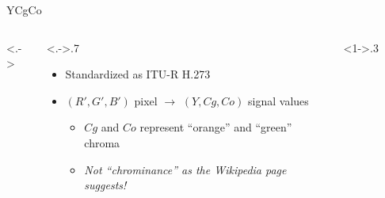 \documentclass[aspectratio=169,usepdftitle=false]{fireshonks}
\begin{document}
\begin{frame}{YCgCo}
    \begin{columns}<.->
        \begin{column}<.->{.7\textwidth}
            \begin{itemize}
                \item Standardized as ITU-R H.273 \parencite*{ycocg}
                \item $(R', G', B')$ pixel $\rightarrow$ $(Y, Cg, Co)$ signal values
                      \begin{itemize}
                          \item $Cg$ and $Co$ represent \enquote{orange} and \enquote{green} chroma
                          \item \emph{Not \enquote{chrominance} as the Wikipedia page suggests!}
                      \end{itemize}
            \end{itemize}
        \end{column}
        \begin{column}<1->{.3\textwidth}
            \begin{figure}

\end{figure}
\end{column}
\end{columns}
\end{frame}
\end{document}
